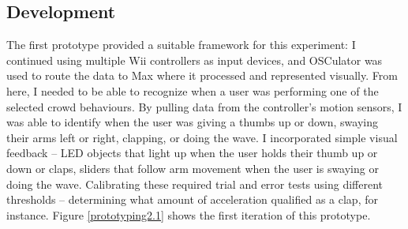 
\subsection{Development}

The first prototype provided a suitable framework for this experiment: I continued using multiple Wii controllers as input devices, and OSCulator was used to route the data to Max where it processed and represented visually. From here, I needed to be able to recognize when a user was performing one of the selected crowd behaviours. By pulling data from the controller's motion sensors, I was able to identify when the user was giving a thumbs up or down, swaying their arms left or right, clapping, or doing the wave. I incorporated simple visual feedback -- LED objects that light up when the user holds their thumb up or down or claps, sliders that follow arm movement when the user is swaying or doing the wave. Calibrating these required trial and error tests using different thresholds -- determining what amount of acceleration qualified as a clap, for instance. Figure \ref{prototyping2.1} shows the first iteration of this prototype.

